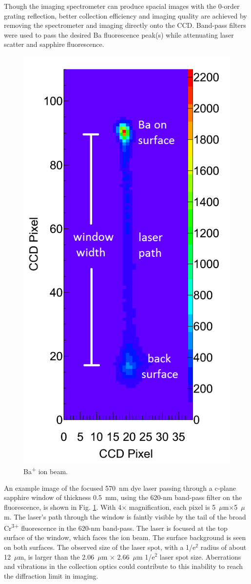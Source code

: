 Though the imaging spectrometer can produce spacial images with the 0-order grating reflection, better collection efficiency and imaging quality are achieved by removing the spectrometer and imaging directly onto the CCD.  Band-pass filters were used to pass the desired Ba fluorescence peak(s) while attenuating laser scatter and sapphire fluorescence.

\begin{figure} %
        \centering
                \includegraphics[width=.4\textwidth]{figures/raw_14-atom_labels_from_paper_1f.png}
                \caption{Ba\textsuperscript{+} ion beam.}
\label{fig:imageexamp}
\end{figure}

An example image of the focused 570~nm dye laser passing through a c-plane sapphire window of thickness 0.5~mm, using the 620-nm band-pass filter on the fluorescence, is shown in Fig. \ref{fig:imageexamp}.  With 4$\times$ magnification, each pixel is 5~$\mu$m$\times$5~$\mu$m.  The laser's path through the window is faintly visible by the tail of the broad Cr\textsuperscript{3+} fluorescence in the 620-nm band-pass.  The laser is focused at the top surface of the window, which faces the ion beam.  The surface background is seen on both surfaces.  The observed size of the laser spot, with a 1/e$^{2}$ radius of about 12~$\mu$m, is larger than the 2.06~$\mu$m $\times$ 2.66~$\mu$m 1/e$^{2}$ laser spot size.  Aberrations and vibrations in the collection optics could contribute to this inability to reach the diffraction limit in imaging.

